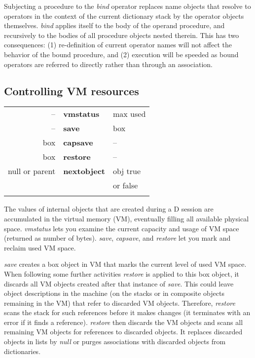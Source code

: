 Subjecting  a procedure to the \emph{bind} operator replaces name  objects  that resolve to operators in the context of the current dictionary stack by the operator  objects  themselves. \emph{bind} applies itself to the  body  of  the operand procedure,  and recursively to the bodies of all procedure objects nested therein.  This has two consequences:  (1) re-definition of  current operator  names will not affect the behavior of the bound  procedure,  and (2) execution will be speeded as bound operators are referred to  directly rather than through an association.

\subsection{Controlling VM resources}

\begin{tabular}{>{\sffamily}r>{\sffamily\bfseries}l>{\sffamily}l}
-- & vmstatus & max used\\
-- & save & box\\
box & capsave & --\\
box & restore & --\\
null or parent & nextobject & obj true\\
            &            & or false\\\\
\end{tabular} 


The  values of internal objects that are created during a D  session  are accumulated  in  the  virtual memory (VM),  eventually  filling  all  available physical space. \emph{vmstatus} lets you examine the current capacity and usage of VM space (returned as number of bytes). \emph{save}, \emph{capsave}, and \emph{restore} let you mark and reclaim used VM space.

\emph{save} creates a box object in VM that marks the current level of used VM space. When following some further activities \emph{restore} is applied to this box object, it discards all VM objects created after that instance of \emph{save}. This could leave object descriptions in the machine (on the stacks or in composite objects remaining in the VM) that refer to discarded VM objects. Therefore, \emph{restore} scans the stack for such references before it makes changes (it terminates with an error if it finds a reference). \emph{restore} then discards the VM objects and scans all remaining VM objects for references to discarded objects. It replaces discarded objects in lists by \emph{null} or purges associations with discarded objects from dictionaries.

